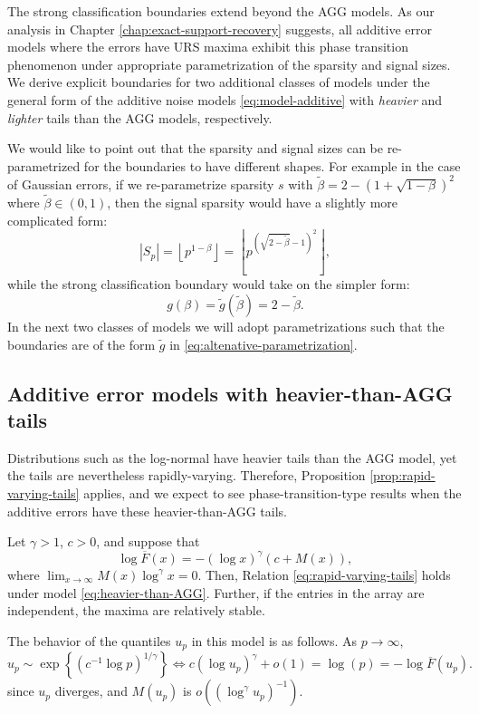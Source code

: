 The strong classification boundaries extend beyond the AGG models.
As our analysis in Chapter \ref{chap:exact-support-recovery} suggests, all additive error models where the errors have URS maxima exhibit this phase transition phenomenon under appropriate parametrization of the sparsity and signal sizes.
We derive explicit boundaries for two additional classes of models under the general form of the additive noise models \eqref{eq:model-additive} with 
{\em heavier} and {\em lighter} tails than the AGG models, respectively. 

We would like to point out that the sparsity and signal sizes can be re-parametrized for the boundaries to have different shapes.
For example in the case of Gaussian errors, if we re-parametrize sparsity $s$ with 
$\widetilde{\beta} = 2 - \left(1 + \sqrt{1-\beta}\right)^2$ where $\widetilde{\beta}\in(0,1)$, then the signal sparsity would have a slightly more complicated form:
$$
\left|S_p\right| = \left\lfloor p^{1-\beta} \right\rfloor = \left\lfloor p^{\left(\sqrt{2 - \widetilde{\beta}} - 1\right)^2}\right\rfloor,
$$
while the strong classification boundary would take on the simpler form:
\begin{equation}\label{eq:altenative-parametrization}
g(\beta) = \widetilde{g}(\widetilde{\beta}) = 2 - \widetilde{\beta}.
\end{equation}
In the next two classes of models we will adopt parametrizations such that the boundaries are of the form $\widetilde{g}$ in \eqref{eq:altenative-parametrization}.

\subsection{Additive error models with heavier-than-AGG tails}

Distributions such as the log-normal have heavier tails than the AGG model, yet the tails are nevertheless rapidly-varying. 
Therefore, Proposition \ref{prop:rapid-varying-tails} applies, and we expect to see phase-transition-type results when the additive errors have these heavier-than-AGG tails.

\begin{example} \label{exmp:heavier-than-AGG}
Let $\gamma>1$, $c>0$, and suppose that
\begin{equation} \label{eq:heavier-than-AGG}
    \log{\overline{F}(x)} = - \left(\log x\right)^\gamma \left(c+M(x)\right),
\end{equation}
where $\lim_{x\to\infty} M(x)\log^\gamma{x}= 0$. Then, Relation \eqref{eq:rapid-varying-tails} holds under 
model \eqref{eq:heavier-than-AGG}. Further, if the entries in the array are independent, the 
maxima are relatively stable.

The behavior of the quantiles $u_p$ in this model is as follows. As $p\to\infty,$
\begin{equation*}
    u_p \sim \exp{\left\{\left(c^{-1}\log{p}\right)^{1/\gamma}\right\}}
    \iff c\left(\log{u_p}\right)^{\gamma} + o(1) = \log(p) = - \log \overline{F}(u_p).
\end{equation*}
since $u_p$ diverges, and $M(u_p)$ is $o((\log^\gamma u_p)^{-1})$.
\end{example}


